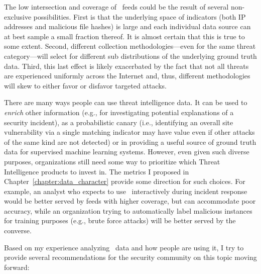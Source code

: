 The low intersection and coverage of \ti\ feeds could be the result of
several non-exclusive possibilities. First is that the underlying space 
of indicators (both IP addresses and malicious file hashes) is large and 
each individual data source can at best sample a small fraction thereof.  
It is almost certain that this is true to some extent. Second, different collection methodologies---even for the same threat category---will select 
for different sub distributions of the underlying ground truth data.
Third, this last effect is likely exacerbated by the fact that not all
threats are experienced uniformly across the Internet and, thus,
different methodologies will skew to either favor or disfavor targeted
attacks.

There are many ways people can use threat intelligence data.
It can be used to \emph{enrich} other information
(e.g., for investigating potential explanations of a security
incident), as a probabilistic canary (i.e., identifying an overall
site vulnerability via a single matching indicator may have value even
if other attacks of the same kind are not detected) or in providing a
useful source of ground truth data for supervised machine learning
systems. However, even given such diverse purposes, organizations still 
need some way to prioritize which Threat Intelligence products to invest 
in. The metrics I proposed in Chapter~\ref{chapter:data_character} 
provide some direction for such choices. For example, an analyst who 
expects to use \ti\ interactively during incident response would be better
served by feeds with higher coverage, but can accommodate poor accuracy, 
while an organization trying to automatically label malicious instances 
for training purposes (e.g., brute force attacks) will be better served by 
the converse.

Based on my experience analyzing \ti\ data and how people are using it, 
I try to provide several recommendations for the security community on this
topic moving forward:

